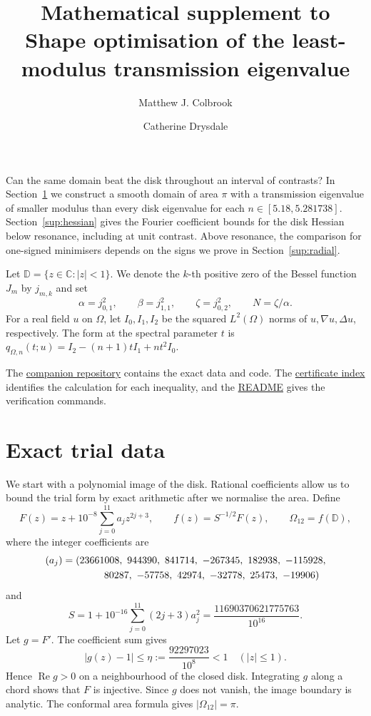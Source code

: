 \documentclass[a4paper,11pt]{amsart}
\title[Mathematical supplement]{Mathematical supplement to\\
Shape optimisation of the least-modulus transmission eigenvalue}
\author{Matthew J. Colbrook}
\author{Catherine Drysdale}
\newcommand{\repofile}[2]{\href{https://github.com/MColbrook/transmission-shape-optimisation/blob/main/#1}{#2}}
\numberwithin{equation}{section}
\theoremstyle{plain}
\theoremstyle{definition}
\newcommand{\D}{\mathbb D}
\DeclareMathOperator{\Rea}{Re}
\begin{document}
\raggedbottom
\maketitle

Can the same domain beat the disk throughout an interval of
contrasts? In Section~\ref{sup:trial} we construct a smooth
domain of area \(\pi\) with a transmission eigenvalue of smaller
modulus than every disk eigenvalue for each \(n\in[5.18,5.281738]\).
Section~\ref{sup:hessian} gives the Fourier coefficient bounds for
the disk Hessian below resonance, including at unit contrast.
Above resonance, the comparison for one-signed minimisers depends
on the signs we prove in Section~\ref{sup:radial}.

Let \(\D=\{z\in\mathbb C:|z|<1\}\). We denote the \(k\)-th positive
zero of the Bessel function \(J_m\) by \(j_{m,k}\) and set
\[
 \alpha=j_{0,1}^2,\qquad \beta=j_{1,1}^2,\qquad
 \zeta=j_{0,2}^2,\qquad N=\zeta/\alpha.
\]
For a real field \(u\) on \(\Omega\), let \(I_0,I_1,I_2\) be the squared
\(L^2(\Omega)\) norms of \(u,\nabla u,\Delta u\), respectively.
The form at the spectral parameter \(t\) is
\(q_{\Omega,n}(t;u)=I_2-(n+1)tI_1+nt^2I_0\).

The \href{https://github.com/MColbrook/transmission-shape-optimisation}{companion repository}
contains the exact data and code. The \repofile{checker-map.md}{certificate index}
identifies the calculation for each inequality, and the
\repofile{README.md}{README} gives the verification commands.

\section{Exact trial data}\label{sup:trial}

We start with a polynomial image of the disk. Rational coefficients
allow us to bound the trial form by exact arithmetic after we
normalise the area. Define
\begin{equation}\label{eq:map12}
 F(z)=z+10^{-8}\sum_{j=0}^{11}a_jz^{2j+3},
 \qquad f(z)=S^{-1/2}F(z),\qquad \Omega_{12}=f(\D),
\end{equation}
where the integer coefficients are
\[
\begin{split}
(a_j)={}&(23661008,\ 944390,\ 841714,\ -267345,\ 182938,\ -115928,\\
        &\hspace{10mm}80287,\ -57758,\ 42974,\ -32778,\ 25473,\ -19906)
\end{split}
\]
and
\[
 S=1+10^{-16}\sum_{j=0}^{11}(2j+3)a_j^2
   =\frac{11690370621775763}{10^{16}}.
\]
Let $g=F'$. The coefficient sum gives
\[
 |g(z)-1|\le\eta:=\frac{92297023}{10^8}<1
 \quad (|z|\le1).
\]
Hence \(\Rea g>0\) on a neighbourhood of the closed disk.
Integrating \(g\) along a chord shows that \(F\) is injective.
Since \(g\) does not vanish, the image boundary is analytic.
The conformal area formula gives \(|\Omega_{12}|=\pi\).
\end{document}
